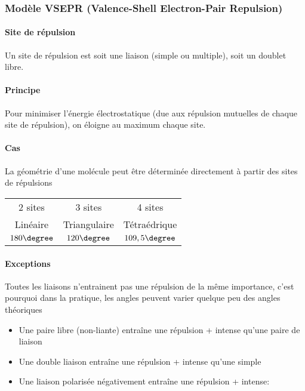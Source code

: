 \subsubsection{Modèle VSEPR (Valence-Shell Electron-Pair Repulsion)}
\paragraph{Site de répulsion}
Un site de répulsion est soit une liaison (simple ou multiple),
soit un doublet libre.

\paragraph{Principe}
Pour minimiser l'énergie électrostatique (due aux répulsion mutuelles de chaque site de répulsion),
on éloigne au maximum chaque site.

\paragraph{Cas}
La géométrie d'une molécule peut être déterminée directement à partir des sites de répulsions
\begin{center}
  \begin{tabular}{ccc}
    2 sites & 3 sites & 4 sites\\
    Linéaire & Triangulaire & Tétraédrique\\
    $180\degree$ & $120\degree$ & $109,5\degree$\\
  \end{tabular}
\end{center}

\paragraph{Exceptions}
Toutes les liaisons n'entrainent pas une répulsion de la même importance,
c'est pourquoi dans la pratique,
les angles peuvent varier quelque peu des angles théoriques
\begin{itemize}
  \item Une paire libre (non-liante) entraîne une répulsion + intense qu'une paire de liaison
  \item Une double liaison entraîne une répulsion + intense qu'une simple
  \item Une liaison polarisée négativement entraîne une répulsion + intense:
    \begin{center}
    \end{center}
\end{itemize}

